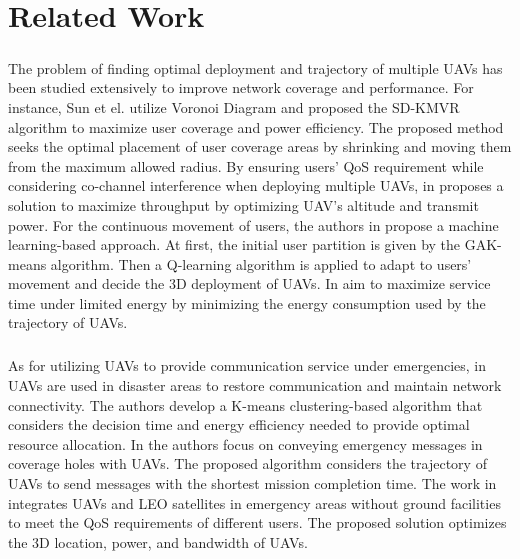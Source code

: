 \documentclass[a4paper,12pt]{report}
\begin{document}

\chapter{Related Work}
\paragraph{}
The problem of finding optimal deployment and trajectory of multiple UAVs has been studied extensively to improve network coverage and performance. For instance, Sun et el. \cite{b14} utilize Voronoi Diagram and proposed the SD-KMVR algorithm to maximize user coverage and power efficiency. The proposed method seeks the optimal placement of user coverage areas by shrinking and moving them from the maximum allowed radius. By ensuring users' QoS requirement while considering co-channel interference when deploying multiple UAVs, in \cite{b15} proposes a solution to maximize throughput by optimizing UAV's altitude and transmit power. For the continuous movement of users, the authors in \cite{b16} propose a machine learning-based approach. At first, the initial user partition is given by the GAK-means algorithm. Then a Q-learning algorithm is applied to adapt to users' movement and decide the 3D deployment of UAVs. In \cite{b17} aim to maximize service time under limited energy by minimizing the energy consumption used by the trajectory of UAVs.
\paragraph{}
As for utilizing UAVs to provide communication service under emergencies, in \cite{b18} UAVs are used in disaster areas to restore communication and maintain network connectivity. The authors develop a K-means clustering-based algorithm that considers the decision time and energy efficiency needed to provide optimal resource allocation. In \cite{b19} the authors focus on conveying emergency messages in coverage holes with UAVs. The proposed algorithm considers the trajectory of UAVs to send messages with the shortest mission completion time. The work in \cite{b20} integrates UAVs and LEO satellites in emergency areas without ground facilities to meet the QoS requirements of different users. The proposed solution optimizes the 3D location, power, and bandwidth of UAVs.
\end{document}
